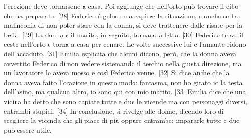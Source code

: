 \documentclass[preview]{standalone}
\begin{document}
l'erezione deve tornarsene a casa. Poi aggiunge che nell'orto può trovare il cibo che ha
preparato. [28] Federico è geloso ma capisce la situazione, e anche se ha malinconia di
non poter stare con la donna, si deve trattenere dalle risate per la beffa. [29] La donna e il
marito, in seguito, tornano a letto. [30] Federico trova il cesto nell'orto e torna a casa per
cenare. Le volte successive lui e l'amante ridono dell'accaduto. [31] Emilia esplicita che
alcuni dicono, però, che la donna aveva avvertito Federico di non vedere sistemando il
teschio nella giusta direzione, ma un lavoratore lo aveva mosso e così Federico venne.
[32] Si dice anche che la donna aveva fatto l'orazione in questo modo: fantasma, non ho
girato io la testa dell'asino, ma qualcun altro, io sono qui con mio marito.
[33] Emilia dice che una vicina ha detto che sono capiate tutte e due le vicende ma con
personaggi diversi, entrambi stupidi. [34] In conclusione, si rivolge alle donne, dicendo loro
di scegliere la vicenda che gli piace di più oppure entrambe: impararle tutte e due può
essere utile.

% 
%
\end{document}
